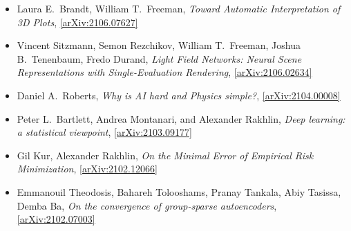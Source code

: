 \begin{itemize}
\item Laura E.\  Brandt, William T.\  Freeman, \textit{Toward Automatic Interpretation of 3D Plots}, \href{https://arxiv.org/abs/2106.07627}{[arXiv:2106.07627]} 
\item Vincent Sitzmann, Semon Rezchikov, William T.\  Freeman, Joshua B.\  Tenenbaum, Fredo Durand, \textit{Light Field Networks: Neural Scene Representations with Single-Evaluation Rendering}, \href{https://arxiv.org/abs/2106.02634}{[arXiv:2106.02634]} 
\item Daniel A.\  Roberts, \textit{Why is AI hard and Physics simple?}, \href{https://arxiv.org/abs/2104.00008}{[arXiv:2104.00008]} 
\item Peter L.\  Bartlett, Andrea Montanari, and Alexander Rakhlin, \textit{Deep learning: a statistical viewpoint}, \href{https://arxiv.org/abs/2103.09177}{[arXiv:2103.09177]} 
\item Gil Kur, Alexander Rakhlin, \textit{On the Minimal Error of Empirical Risk Minimization}, \href{https://arxiv.org/abs/2102.12066}{[arXiv:2102.12066]} 
\item Emmanouil Theodosis, Bahareh Tolooshams, Pranay Tankala, Abiy Tasissa, Demba Ba, \textit{On the convergence of group-sparse autoencoders}, \href{https://arxiv.org/abs/2102.07003}{[arXiv:2102.07003]} 
\end{itemize}